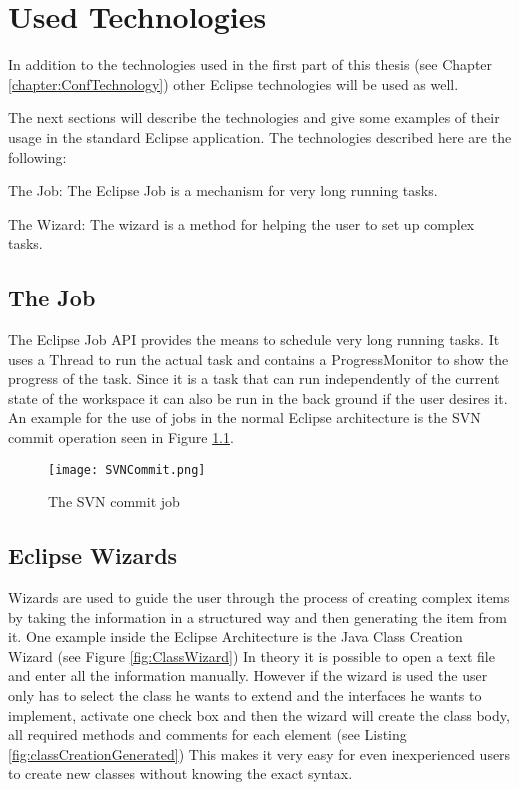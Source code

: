 \chapter{Used Technologies}
\label{chapter:AutoTechnologies}

In addition to the technologies used in the first part of this
thesis (see Chapter \ref{chapter:ConfTechnology}) other Eclipse
technologies will be used as well.

The next sections will describe the technologies and give some
examples of their usage in the standard Eclipse application.
The technologies described here are the following:
\begin{description}
 \item The Job: The Eclipse Job is a mechanism for very long running tasks.
 \item The Wizard: The wizard is a method for helping the user to set up complex tasks.
\end{description}


\section{The Job}
\label{section:AutoTechJob}

The Eclipse Job \ac{API} provides the means to schedule very long running tasks.
It uses a Thread to run the actual task and contains a ProgressMonitor to show
the progress of the task. Since it is a task that can run independently of the
current state of the workspace it can also be run in the back ground if the user
desires it.
An example for the use of jobs in the normal Eclipse architecture
is the SVN commit operation seen in Figure \ref{fig:SVNCommit}.

\begin{figure}[SVNCommit]
  \centering
  \texttt{[image: SVNCommit.png]}
  \caption[The SVN commit job]%
  {The SVN commit job\protect}
  \label{fig:SVNCommit}
\end{figure}

\section{Eclipse Wizards}
\label{section:AutoTechWizards}
Wizards are used to guide the user through the process of creating complex items by taking
the information in a structured way and then generating the item from it.
One example inside the Eclipse Architecture is the Java Class Creation Wizard (see Figure \ref{fig:ClassWizard})
In theory it is possible to open a text file and enter all the information manually.
However if the wizard is used the user only has to select the class he wants to extend
and the interfaces he wants to implement, activate one check box and then the wizard will
create the class body, all required methods and comments for each element (see Listing \ref{fig:classCreationGenerated})
This makes it very easy for even inexperienced users to create new classes without knowing
the exact syntax.

